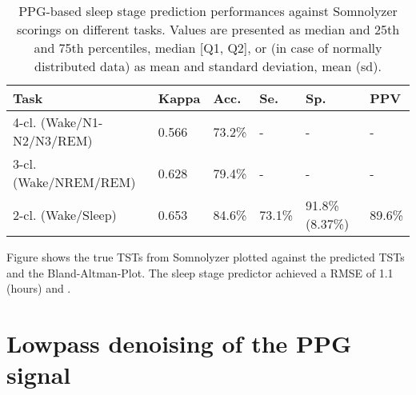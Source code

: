 \renewcommand{\arraystretch}{1.5}
\begin{table}[h!]
    \centering
    \begin{tabular}{ p{2.5cm} p{2cm} p{2.3cm} p{2.3cm} p{1.5cm} p{2.3cm} }
        Task & Kappa & Acc. & Se. & Sp. & PPV \\
        \hline
        4-cl. \newline (Wake/N1-\newline N2/N3/REM) & 0.566 \newline [0.436, 0.677] & 73.2\%\newline [64.8\%, 80.0\%] & - & - & - \\
        3-cl. \newline (Wake/NREM\newline/REM) & 0.628 \newline [0.473, 0.740] & 79.4\%\newline [70.8\%, 85.6\%] & - & - & - \\
        2-cl. \newline (Wake/Sleep) & 0.653 \newline [0.475, 0.778] & 84.6\% \newline [76.2\%, 90.3\%] & 73.1\% \newline [56.9\%, 84.9\%] & 91.8\% \newline (8.37\%) & 89.6\% \newline [79.0\%, 95.2\%] \\
    \end{tabular}
    \caption{PPG-based sleep stage prediction performances against Somnolyzer scorings on different tasks. Values are presented as median and 25th and 75th percentiles, median [Q1, Q2], or (in case of normally distributed data) as mean and standard deviation, mean (sd). \label{tab:predicted-hypnogram-results}}
\end{table}

Figure  shows the true TSTs from Somnolyzer plotted against the predicted TSTs and the Bland-Altman-Plot. The sleep stage predictor achieved a RMSE of 1.1 (hours) and .


\section{Lowpass denoising of the PPG signal \label{Apx-Denoise}}


